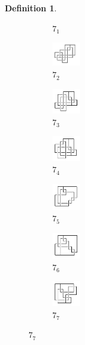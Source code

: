 \documentclass{article}
\theoremstyle{definition}
\newtheorem{defn}[thm]{Definition}
\theoremstyle{theorem}
\theoremstyle{proposition}
\theoremstyle{corollary}
\begin{document}
\begin{defn}
\begin{figure}[H]
\begin{subfigure}{0.075\textwidth}
    \caption{$7_{1}$} 
    \end{subfigure}
    \begin{subfigure}{0.075\textwidth}
    \includegraphics[width=1.25cm]{../Midterm_Poster/grid_diagram/handcuff_7_2.png}
    \caption{$7_{2}$} 
    \end{subfigure}
    \begin{subfigure}{0.075\textwidth}
    \includegraphics[width=1.25cm]{../Midterm_Poster/grid_diagram/handcuff_7_3.png}
    \caption{$7_{3}$} 
    \end{subfigure}
    \begin{subfigure}{0.075\textwidth}
    \includegraphics[width=1.25cm]{../Midterm_Poster/grid_diagram/handcuff_7_4.png}
    \caption{$7_{4}$} 
    \end{subfigure}
    \begin{subfigure}{0.075\textwidth}
    \includegraphics[width=1.25cm]{../Midterm_Poster/grid_diagram/handcuff_7_5.png}
    \caption{$7_{5}$} 
    \end{subfigure}
    \begin{subfigure}{0.075\textwidth}
    \includegraphics[width=1.25cm]{../Midterm_Poster/grid_diagram/handcuff_7_6.png}
    \caption{$7_{6}$} 
    \end{subfigure}
    \begin{subfigure}{0.075\textwidth}
    \includegraphics[width=1.25cm]{../Midterm_Poster/grid_diagram/handcuff_7_7.png}
    \caption{$7_{7}$} 
    \end{subfigure}

\end{figure}
\end{defn}
\end{document}

